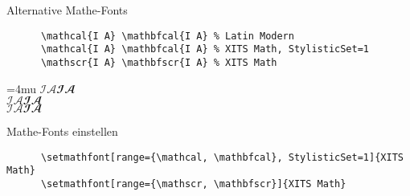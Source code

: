 \begin{frame}[fragile]{Alternative Mathe-Fonts}
  \begin{CodeExample}{0.83}
    \begin{lstlisting}
      \mathcal{I A} \mathbfcal{I A} % Latin Modern
      \mathcal{I A} \mathbfcal{I A} % XITS Math, StylisticSet=1
      \mathscr{I A} \mathbfscr{I A} % XITS Math
    \end{lstlisting}
  \CodeResult
    \Umathordordspacing\textstyle=4mu
    $\mathcal{I A} \mathbfcal{I A}$ \\
    { $\mathcal{I A} \mathbfcal{I A}$} \\
    $\mathscr{I A} \mathbfscr{I A}$
  \end{CodeExample}

  \begin{block}{Mathe-Fonts einstellen}
    \begin{lstlisting}
      \setmathfont[range={\mathcal, \mathbfcal}, StylisticSet=1]{XITS Math}
      \setmathfont[range={\mathscr, \mathbfscr}]{XITS Math}
    \end{lstlisting}
  \end{block}
\end{frame}
